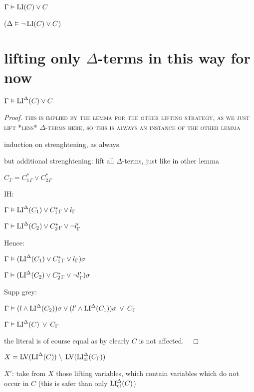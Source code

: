 \documentclass[,%
	draft=false,%
	numbers=noendperiod
	11pt,
	a4paper,
	oneside,%
	openany,
]{memoir}
\begin{document}
$\Gamma \vDash \operatorname{LI}(C) \lor C$

($\Delta \vDash \lnot \operatorname{LI}(C) \lor C$)

\section{lifting only $\Delta$-terms in this way for now}


\begin{clemma}
	$\Gamma \vDash \operatorname{LI}^\Delta(C) \lor C$
\end{clemma}
\begin{proof}
	\textsc{this is implied by the lemma for the other lifting strategy, as we just lift *less* $\Delta$-terms here, so this is always an instance of the other lemma}

	induction on strenghtening, as always.

	but additional strenghtening: lift all $\Delta$-terms, just like in other lemma

	{ \tiny

	$C_\Gamma =
	C_1^*{}_\Gamma \lor
	C_2^*{}_\Gamma$

	IH:

	$\Gamma \vDash \operatorname{LI}^\Delta(C_1) \lor C_1^*{}_\Gamma \lor l_\Gamma$

	$\Gamma \vDash \operatorname{LI}^\Delta(C_2) \lor C_2^*{}_\Gamma \lor \lnot l'_\Gamma$

	Hence:

	$\Gamma \vDash ( \operatorname{LI}^\Delta(C_1) \lor C_1^*{}_\Gamma \lor l_\Gamma )\sigma$

	$\Gamma \vDash ( \operatorname{LI}^\Delta(C_2) \lor C_2^*{}_\Gamma \lor \lnot l'_\Gamma )\sigma$

	Supp grey:

	$\Gamma \vDash
	(l \land \operatorname{LI}^\Delta(C_2))\sigma \lor (l' \land \operatorname{LI}^\Delta(C_1))\sigma
	\;\,{\lor}\;\, C_\Gamma $

	$\Gamma \vDash  \operatorname{LI}^\Delta(C) \;\,{\lor}\;\, C_\Gamma $

	the literal is of course equal as by clearly $C$ is not affected.
	~


}
\end{proof}

$X = \operatorname{LV}(\operatorname{LI}^\Delta(C)) \;{\setminus}\; \operatorname{LV}(\operatorname{LI}_{\operatorname{cl}}^\Delta(C_\Gamma))$

$X'$: take from $X$ those lifting variables, which contain variables which do not occur in $C$ (this is safer than only $\operatorname{LI}_{\operatorname{cl}}^\Delta(C)$)
\end{document}
